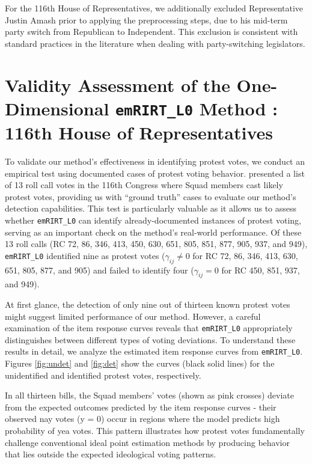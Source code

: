 \documentclass[11pt]{article}
\begin{document}
For the 116th House of Representatives, we additionally excluded Representative Justin Amash prior to applying the preprocessing steps, due to his mid-term party switch from Republican to Independent. This exclusion is consistent with standard practices in the literature when dealing with party-switching legislators.

\FloatBarrier
\section{Validity Assessment of the One-Dimensional \texttt{emRIRT\_L0} Method : 116th House of Representatives}\label{Appen_D}

To validate our method's effectiveness in identifying protest votes, we conduct an empirical test using documented cases of protest voting behavior. \cite{Lewis2022} presented a list of 13 roll call votes in the 116th Congress where Squad members cast likely protest votes, providing us with ``ground truth'' cases to evaluate our method's detection capabilities. This test is particularly valuable as it allows us to assess whether \texttt{emRIRT\_L0} can identify already-documented instances of protest voting, serving as an important check on the method's real-world performance. Of these 13 roll calls (RC 72, 86, 346, 413, 450, 630, 651, 805, 851, 877, 905, 937, and 949), \texttt{emRIRT\_L0} identified nine as protest votes ($\gamma_{ij} \neq 0$ for RC 72, 86, 346, 413, 630, 651, 805, 877, and 905) and failed to identify four ($\gamma_{ij} = 0$ for RC 450, 851, 937, and 949).

At first glance, the detection of only nine out of thirteen known protest votes might suggest limited performance of our method. However, a careful examination of the item response curves reveals that \texttt{emRIRT\_L0} appropriately distinguishes between different types of voting deviations. To understand these results in detail, we analyze the estimated item response curves from \texttt{emRIRT\_L0}. Figures \ref{fig:undet} and \ref{fig:det} show the curves (black solid lines) for the unidentified and identified protest votes, respectively.

In all thirteen bills, the Squad members' votes (shown as pink crosses) deviate from the expected outcomes predicted by the item response curves - their observed nay votes (y = 0) occur in regions where the model predicts high probability of yea votes. This pattern illustrates how protest votes fundamentally challenge conventional ideal point estimation methods by producing behavior that lies outside the expected ideological voting patterns.
\end{document}
